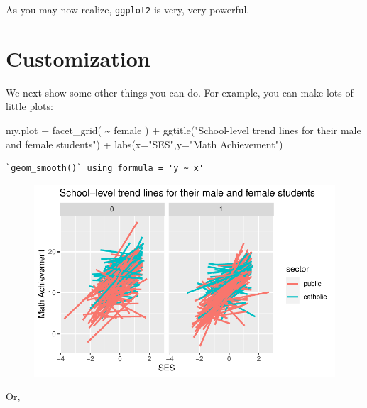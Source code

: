 \documentclass[
  letterpaper,
  DIV=11,
  numbers=noendperiod]{scrreprt}
\newenvironment{Shaded}{\begin{snugshade}}{\end{snugshade}}
\newcommand{\AttributeTok}[1]{\textcolor[rgb]{0.49,0.56,0.16}{#1}}
\newcommand{\FunctionTok}[1]{\textcolor[rgb]{0.02,0.16,0.49}{#1}}
\newcommand{\NormalTok}[1]{\textcolor[rgb]{0.00,0.44,0.13}{#1}}
\newcommand{\SpecialCharTok}[1]{\textcolor[rgb]{0.25,0.44,0.63}{#1}}
\newcommand{\StringTok}[1]{\textcolor[rgb]{0.25,0.44,0.63}{#1}}
\begin{document}
As you may now realize, \texttt{ggplot2} is very, very powerful.

\hypertarget{customization}{%
\section{Customization}\label{customization}}

We next show some other things you can do. For example, you can make
lots of little plots:

\begin{Shaded}
\begin{Highlighting}[]
\NormalTok{my.plot }\SpecialCharTok{+} 
  \FunctionTok{facet\_grid}\NormalTok{( }\SpecialCharTok{\textasciitilde{}}\NormalTok{ female ) }\SpecialCharTok{+} 
    \FunctionTok{ggtitle}\NormalTok{(}\StringTok{"School{-}level trend lines for their male and female students"}\NormalTok{) }\SpecialCharTok{+}
    \FunctionTok{labs}\NormalTok{(}\AttributeTok{x=}\StringTok{"SES"}\NormalTok{,}\AttributeTok{y=}\StringTok{"Math Achievement"}\NormalTok{) }
\end{Highlighting}
\end{Shaded}

\begin{verbatim}
`geom_smooth()` using formula = 'y ~ x'
\end{verbatim}

\begin{figure}[H]

{\centering \includegraphics{intro_ggplot_files/figure-pdf/unnamed-chunk-7-1.pdf}

}

\end{figure}

Or,
\end{document}

